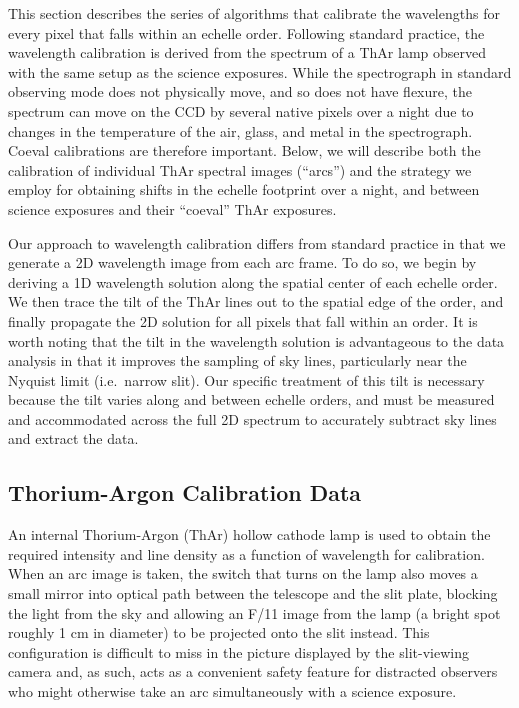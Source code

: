 \documentclass[12pt,preprint]{aastex}
\begin{document}
This section describes the series of algorithms that calibrate the
wavelengths for every pixel that falls within an
echelle order.  Following standard practice, the wavelength
calibration is derived from the spectrum of a ThAr lamp observed with
the same setup as the science exposures.  While the
spectrograph in standard observing mode does not physically move, and so
does not have flexure, the spectrum can move on the CCD by several
native pixels over a night due to changes in the temperature of the
air, glass, and metal in the spectrograph.  Coeval calibrations are
therefore important.  Below, we will describe both the calibration of
individual ThAr spectral images (``arcs'') and the strategy we employ for obtaining
shifts in the echelle footprint over a night, and between 
science exposures and their ``coeval'' ThAr exposures.

Our approach to wavelength calibration differs from standard practice
in that we generate a 2D wavelength image from each arc frame.  To do
so, we begin by deriving a 1D wavelength solution along the spatial
center of each echelle order.  We then trace the tilt of the ThAr lines
out to the spatial edge of the order, and finally propagate the 2D
solution for all pixels that fall within an order.  It is worth noting
that the tilt in the wavelength solution is advantageous to the data
analysis in that it improves the sampling of sky lines, particularly
near the Nyquist limit (i.e.\ narrow slit).  Our specific treatment
of this tilt is necessary because the tilt varies along and between
echelle orders, and must be measured and accommodated across the full 2D
spectrum to accurately subtract  sky lines and 
extract the data.

\subsection{Thorium-Argon Calibration Data}

An internal Thorium-Argon (ThAr) hollow cathode lamp is used to 
obtain the required intensity and
line density as a function of wavelength for calibration. When an arc
image is taken, the switch that turns on the lamp also moves a small
mirror into optical path between the telescope and the slit plate,
blocking the light from the sky and allowing an F/11 image from the
lamp (a bright spot roughly 1 cm in diameter) to be projected onto the
slit instead. This configuration is difficult to miss in the picture
displayed by the slit-viewing camera and, as such, acts 
as a convenient safety feature for
distracted observers who might otherwise take an arc simultaneously
with a science exposure.
\end{document}
